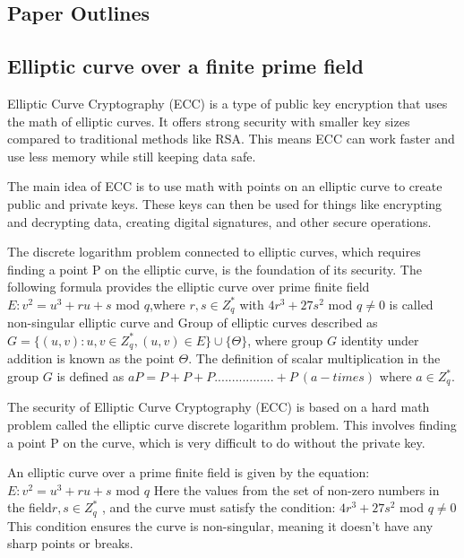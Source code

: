 \documentclass[3p,times,onecolumn]{elsarticle}
\begin{document}
\subsection{\textbf{Paper Outlines}}









\subsection{\textbf{Elliptic curve over a finite prime field }}


Elliptic Curve Cryptography (ECC) is a type of public key encryption that uses the math of elliptic curves. It offers strong security with smaller key sizes compared to traditional methods like RSA. This means ECC can work faster and use less memory while still keeping data safe.

The main idea of ECC is to use math with points on an elliptic curve to create public and private keys. These keys can then be used for things like encrypting and decrypting data, creating digital signatures, and other secure operations.

The discrete logarithm problem connected to elliptic curves, which requires finding a point P on the elliptic curve, is the foundation of its security.
The following formula provides the elliptic curve over prime finite field $E: v^2=u^3+ru+s$ mod $q$,where $r,s\in Z_{q}^{*}$ with $4r^3+27s^2$ mod $q\neq0$ is called non-singular elliptic curve and Group of elliptic curves described as $G=\{(u,v): u,v\in Z_{q}^{*}, (u,v)\in E\}\cup \{\Theta\}$, where group $G$ identity under addition is known as the point $\Theta$. The definition of scalar multiplication in the group $G$ is defined as $aP=P+P+P.................+P~(a-times)$ where $a\in Z_{q}^{*}$.


The security of Elliptic Curve Cryptography (ECC) is based on a hard math problem called the elliptic curve discrete logarithm problem. This involves finding a point P on the curve, which is very difficult to do without the private key.

An elliptic curve over a prime finite field is given by the equation:
$E: v^2=u^3+ru+s$ mod $q$
Here the values from the set of non-zero numbers in the field$r,s\in Z_{q}^{*}$ , and the curve must satisfy the condition:
$4r^3+27s^2$ mod $q\neq0$
This condition ensures the curve is non-singular, meaning it doesn’t have any sharp points or breaks.
\end{document}

